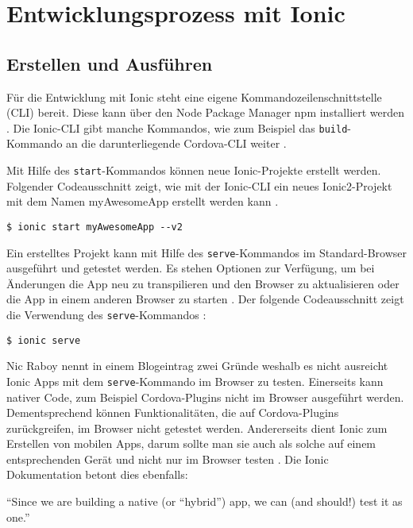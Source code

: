 \chapter{Entwicklungsprozess mit Ionic}
\label{Entwicklungsprozess}

\section{Erstellen und Ausführen}

Für die Entwicklung mit Ionic steht eine eigene Kommandozeilenschnittstelle (CLI) bereit. Diese kann über den Node Package Manager npm installiert werden \cite{ionic:cli}. Die Ionic-CLI gibt manche Kommandos, wie zum Beispiel das \texttt{build}-Kommando an die darunterliegende Cordova-CLI weiter \cite{ionic:build}.

Mit Hilfe des \texttt{start}-Kommandos können neue Ionic-Projekte erstellt werden. Folgender Codeausschnitt zeigt, wie mit der Ionic-CLI ein neues Ionic2-Projekt mit dem Namen myAwesomeApp erstellt werden kann \cite{ionic:cli}.
\begin{codebox}
\begin{lstlisting}[style=typescript]
$ ionic start myAwesomeApp --v2
\end{lstlisting}
\end{codebox}

Ein erstelltes Projekt kann mit Hilfe des \texttt{serve}-Kommandos im Standard-Browser ausgeführt und getestet werden. Es stehen Optionen zur Verfügung, um bei Änderungen die App neu zu transpilieren und den Browser zu aktualisieren oder die App in einem anderen Browser zu starten \cite{ionic:serve}. Der folgende Codeausschnitt zeigt die Verwendung des \texttt{serve}-Kommandos \cite{ionic:cli}:
\begin{codebox}
\begin{lstlisting}[style=typescript]
$ ionic serve
\end{lstlisting}
\end{codebox}

Nic Raboy nennt in einem Blogeintrag zwei Gründe weshalb es nicht ausreicht Ionic Apps mit dem \texttt{serve}-Kommando im Browser zu testen. Einerseits kann nativer Code, zum Beispiel Cordova-Plugins nicht im Browser ausgeführt werden. Dementsprechend können Funktionalitäten, die auf Cordova-Plugins zurückgreifen, im Browser nicht getestet werden. Andererseits dient Ionic zum Erstellen von mobilen Apps, darum sollte man sie auch als solche auf einem entsprechenden Gerät und nicht nur im Browser testen \cite{raboy:serve}. Die Ionic Dokumentation betont dies ebenfalls:
\begin{citeenv}
	``Since we are building a native (or “hybrid”) app, we can (and should!) test it as one.'' \cite{ionic:testing}
\end{citeenv}

